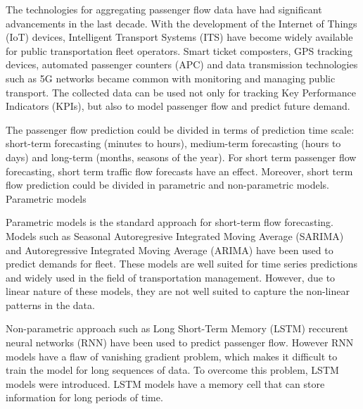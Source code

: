\hspace{1 em} The technologies for aggregating passenger flow data have had significant
advancements in the last decade. With the development of the Internet of Things (IoT)
devices, Intelligent Transport Systems (ITS) have become widely available for public
transportation fleet operators. Smart ticket composters, GPS tracking devices, automated
passenger counters (APC) and data transmission technologies such as 5G networks became
common with monitoring and managing public transport. 
The collected data can be used not only for tracking Key Performance Indicators (KPIs),
but also to model passenger flow and predict future demand. 

The passenger flow prediction could be divided in terms of prediction time scale: short-term
forecasting (minutes to hours), medium-term forecasting (hours to days) and long-term (months, seasons of the year).
For short term passenger flow forecasting, short term traffic flow forecasts have an effect. Moreover,
short term flow prediction could be divided in parametric and non-parametric models. Parametric models

Parametric models is the standard approach for short-term flow forecasting. Models such as 
Seasonal Autoregresive Integrated Moving Average (SARIMA) and Autoregressive Integrated Moving Average (ARIMA)
have been used to predict demands for fleet\cite{ARIMA}. These models are well suited for time series predictions
and widely used in the field of transportation management. However, due to linear nature of these models, they are not
well suited to capture the non-linear patterns in the data.

Non-parametric approach such as Long Short-Term Memory (LSTM) reccurent neural networks (RNN) have been used to predict passenger flow\cite{LSTM}.
However RNN models have a flaw of vanishing gradient problem, which makes it difficult to train the model for long sequences of data.
To overcome this problem, LSTM models were introduced. LSTM models have a memory cell that can store information for long periods of time.
